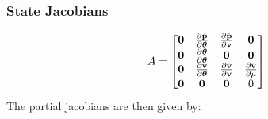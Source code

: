 \documentclass[a4paper]{article}
\begin{document}
\subsubsection{State Jacobians}
\begin{equation}
  A =
  \begin{bmatrix}
    \boldsymbol{\mathrm{0}} & \frac{\partial \dot{\boldsymbol{\mathrm{p}}}}{\partial \boldsymbol{\mathrm{\theta}}} &
    \frac{\partial \dot{\boldsymbol{\mathrm{p}}}}{\partial \boldsymbol{\mathrm{v}}} & \boldsymbol{\mathrm{0}} \\
    \boldsymbol{\mathrm{0}} & \frac{\partial \dot{\boldsymbol{\mathrm{\theta}}}}{\partial \boldsymbol{\mathrm{\theta}}} &
    \boldsymbol{\mathrm{0}} & \boldsymbol{\mathrm{0}} \\
    \boldsymbol{\mathrm{0}} & \frac{\partial \dot{\boldsymbol{\mathrm{v}}}}{\partial \boldsymbol{\mathrm{\theta}}} & \frac{\partial \dot{\boldsymbol{\mathrm{v}}}}{\partial \boldsymbol{\mathrm{v}}} & \frac{\partial \dot{\boldsymbol{\mathrm{v}}}}{\partial \mu} \\
    \boldsymbol{\mathrm{0}} & \boldsymbol{\mathrm{0}} & \boldsymbol{\mathrm{0}} & 0 
  \end{bmatrix}
\end{equation}
The partial jacobians are then given by:
\end{document}
